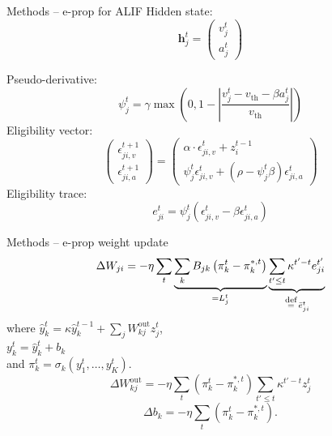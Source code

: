 \documentclass[t]{beamer}
\newcommand\eqdef{\ \mathrel{\overset{\makebox[0pt]{\mbox{\normalfont\scriptsize\rmfamily def}}}{=}}\ }
\begin{document}
\begin{frame}{Methods -- e-prop for ALIF}
  Hidden state:
  \begin{equation}
  \mathbf{h}^t_j = \begin{pmatrix}
  v^t_j\\
  a^t_j
  \end{pmatrix}
  \end{equation}

  Pseudo-derivative:
  \begin{equation}
  \psi_j^t = \gamma \max\left(0, 1 - \left|\frac{v_j^t - v_\text{th} - \beta a^t_j}{v_\text{th}}\right|\right)
  \end{equation}
  Eligibility vector:
  \begin{equation}
  \begin{pmatrix}
              \epsilon_{ji, v}^{t+1}\\
              \epsilon_{ji, a}^{t+1}
              \end{pmatrix} = \begin{pmatrix}
              \alpha \cdot\epsilon_{ji, v}^t + z_i^{t-1}\\
              \psi^t_j\epsilon^t_{ji, v} + \left(\rho-\psi^t_j\beta\right)\epsilon^t_{ji, a}
              \end{pmatrix}
  \end{equation}
  Eligibility trace:
  \begin{equation}
  e^t_{ji} = \psi^t_j\left(\epsilon_{ji, v}^t - \beta\epsilon_{ji, a}^t\right)
  \end{equation}
\end{frame}

\begin{frame}{Methods -- e-prop weight update}
  \begin{equation}
    \Delta W_{ji} = -\eta\sum_t\underbrace{\sum_kB_{jk}\left(\pi^{t}_k - \pi^{*,t}_k\right)}_{=L^t_j}\underbrace{\sum_{t'\leq t}\kappa^{t'-t}e^{t'}_{ji}}_{\eqdef \bar{e}^t_{ji}}
    \end{equation}
    where $\hat{y}^t_k = \kappa \hat{y}^{t-1}_k + \sum_j W^\text{out}_{kj}z^t_j$,\\
    $y^t_k = \hat{y}^t_k+b_k$\\
    and $\pi^t_k = \sigma_k\left(y^t_1,\ldots,y^t_K\right)$.
    \begin{equation}
    \Delta W^\text{out}_{kj} = -\eta \sum_t\left(\pi^t_k - \pi^{*,t}_k\right)\sum_{t'\leq t}\kappa^{t'-t}z^t_j
    \end{equation}
    \begin{equation}
    \Delta b_k = -\eta \sum_t\left(\pi^t_k - \pi^{*,t}_k\right).
    \end{equation}
\end{frame}
\end{document}
